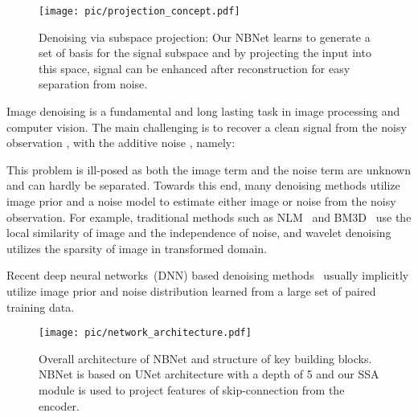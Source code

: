\documentclass[final]{cvpr}
\newcommand{\remove}[1]{}
\begin{document}
\begin{figure}[t]
    \centering
    \texttt{[image: pic/projection\_concept.pdf]}
    \caption{Denoising via subspace projection: Our NBNet learns to generate a set of basis for the signal subspace and by projecting the input into this space, signal can be enhanced after reconstruction for easy separation from noise.}
    \label{fig:projection_concept}
\end{figure}
Image denoising is a fundamental and long lasting task in image processing and computer vision. The main challenging is to recover a clean signal  from the noisy observation , with the additive noise , namely:

This problem is ill-posed as both the image term  and the noise term  are unknown and can hardly be separated. Towards this end, many denoising methods utilize image prior and a noise model to estimate either image or noise from the noisy observation. For example, traditional methods such as NLM~\cite{buades2005non} and BM3D~\cite{dabov2007image} use the local similarity of image and the independence of noise, and wavelet denoising~\cite{portilla2003image} utilizes the sparsity of image in transformed domain. 

Recent deep neural networks~(DNN) based denoising methods~\cite{tai2017memnet,chen2017trainable,zhou2019awgn,jain2009natural,xie2012image,mao2016image,ulyanov2018deep} usually implicitly utilize image prior and noise distribution learned from a large set of paired training data. \remove{Although previous DNNs based methods have achieved tremendous success, it still remains challenging to restore high quality images from extremely noisy ones where the noise is hard to model. Moreover, it is also problematic for those methods to distinguish flatten regions and area with weak textures, learning to over-smooth or insufficient denoising. }








\begin{figure*}[h]
    \begin{center}
        \texttt{[image: pic/network\_architecture.pdf]}
    \end{center}
    \caption{Overall architecture of NBNet and structure of key building blocks. NBNet is based on UNet architecture with a depth of 5 and our SSA module is used to project features of skip-connection from the encoder. }
    \label{fig:architecture}
\end{figure*}
\end{document}
